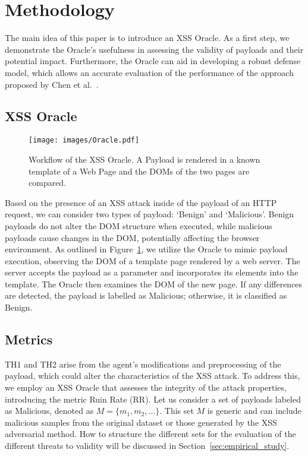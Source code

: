 \section{Methodology}
\label{sec:method}

The main idea of this paper is to introduce an XSS Oracle.
As a first step, we demonstrate the Oracle's usefulness in assessing the validity of payloads and their potential impact. Furthermore, the Oracle can aid in developing a robust defense model, which allows an accurate evaluation of the performance of the approach proposed by Chen et al.~\cite{CHEN2022102831}.



\subsection{XSS Oracle}

\begin{figure}[!h]
  \centering
  \texttt{[image: images/Oracle.pdf]}
  
  \caption{Workflow of the XSS Oracle. A Payload is rendered in a known template of a Web Page and the DOMs of the two pages are compared.}\label{fig:Oracle}
\end{figure}

Based on the presence of an XSS attack inside of the payload of an HTTP request, we can consider two types of payload: `Benign' and `Malicious'.
Benign payloads do not alter the DOM structure when executed, while malicious payloads cause changes in the DOM, potentially affecting the browser environment. As outlined in Figure~\ref{fig:Oracle}, we utilize the Oracle to mimic payload execution, observing the DOM of a template page rendered by a web server. The server accepts the payload as a parameter and incorporates its elements into the template. The Oracle then examines the DOM of the new page. If any differences are detected, the payload is labelled as Malicious; otherwise, it is classified as Benign.



\subsection{Metrics}

TH1 and TH2 arise from the agent's modifications and preprocessing of the payload, which could alter the characteristics of the XSS attack. To address this, we employ an XSS Oracle that assesses the integrity of the attack properties, introducing the metric Ruin Rate (RR).
Let us consider a set of payloads labeled as Malicious, denoted as $M=\{m_1, m_2, \ldots\}$. This set $M$ is generic and can include malicious samples from the original dataset or those generated by the XSS adversarial method. 
How to structure the different sets for the evaluation of the different threats to validity will be discussed in Section~\ref{sec:empirical_study}. %


